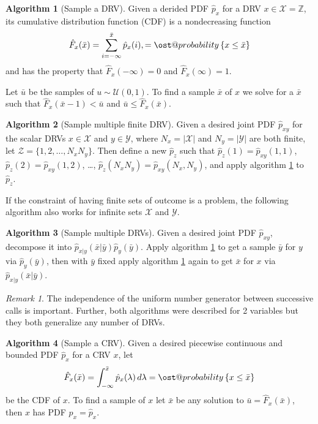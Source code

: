 \documentclass[]{hsrzf}
\makeatletter
\renewcommand*{\Pr}[2][]{\ost@probability_{#1}\left\{#2\right\}}
\theoremstyle{plain}
\theoremstyle{definition}
\newtheorem{alg}{Algorithm}[section]
\theoremstyle{remark}
\newtheorem*{remark}{Remark}
\makeatother
\begin{document}
\begin{alg}[Sample a DRV] \label{alg:sample-drv}
  Given a derided PDF $\hat{p}_x$ for a DRV $x \in \mathcal{X} = \mathbb{Z}$,
  its cumulative distribution function (CDF) is a nondecreasing function
  \[
    \hat{F}_x (\bar{x}) = \sum_{i = -\infty}^{\bar{x}} \hat{p}_x (i),
    = \Pr{x \leq \bar{x}}
  \]
  and has the property that $\hat{F}_x(-\infty) = 0$ and $\hat{F}_x(\infty) =
  1$.

  Let $\bar{u}$ be the samples of $u \sim \mathcal{U}(0,1)$. To find
  a sample $\bar{x}$ of $x$ we solve for a $\bar{x}$ such that
  $\hat{F}_x(\bar{x} -1) < \bar{u}$ and $\bar{u} \leq \hat{F}_x(\bar{x})$.
\end{alg}

\begin{alg}[Sample multiple finite DRV]
  Given a desired joint PDF $\hat{p}_{xy}$ for the scalar DRVs $x \in
  \mathcal{X}$ and $y \in \mathcal{Y}$, where $N_x = |\mathcal{X}|$ and
  $N_y = |\mathcal{Y}|$ are both finite, let $\mathcal{Z} = \{1,2,\ldots,
  N_xN_y\}$. Then define a new $\hat{p}_z$ such that $\hat{p}_z(1) =
  \hat{p}_{xy}(1,1)$, $\hat{p}_z(2) = \hat{p}_{xy}(1,2)$, \dots,
  $\hat{p}_z(N_xN_y) = \hat{p}_{xy}(N_x, N_y)$, and apply algorithm
  \ref{alg:sample-drv} to $\hat{p}_z$.
\end{alg}

If the constraint of having finite sets of outcome is a problem, the following
algorithm also works for infinite sets $\mathcal{X}$ and $\mathcal{Y}$.

\begin{alg}[Sample multiple DRVs] \label{alg:sample-multiple-drvs}
  Given a desired joint PDF $\hat{p}_{xy}$, decompose it into
  $\hat{p}_{x|y}(\bar{x}|\bar{y}) \hat{p}_y(\bar{y})$. Apply algorithm
  \ref{alg:sample-drv} to get a sample $\bar{y}$ for $y$ via
  $\hat{p}_y(\bar{y})$, then with $\bar{y}$ fixed apply algorithm
  \ref{alg:sample-drv} again to get $\bar{x}$ for $x$ via
  $\hat{p}_{x|y}(\bar{x}|\bar{y})$.
\end{alg}

\begin{remark}
  The independence of the uniform number generator between successive calls is
  important. Further, both algorithms were described for 2 variables but they
  both generalize any number of DRVs.
\end{remark}

\begin{alg}[Sample a CRV] \label{alg:sample-crv}
  Given a desired piecewise continuous and bounded PDF $\hat{p}_x$ for a CRV
  $x$, let
  \[
    \hat{F}_x(\bar{x})
      = \int_{-\infty}^{\bar{x}} \hat{p}_x(\lambda) \, d\lambda
      = \Pr{x \leq \bar{x}}
  \]
  be the CDF of $x$. To find a sample of $x$ let $\bar{x}$ be any solution to
  $\bar{u} = \hat{F}_x(\bar{x})$, then $x$ has PDF $p_x = \hat{p}_x$.
\end{alg}
\end{document}
